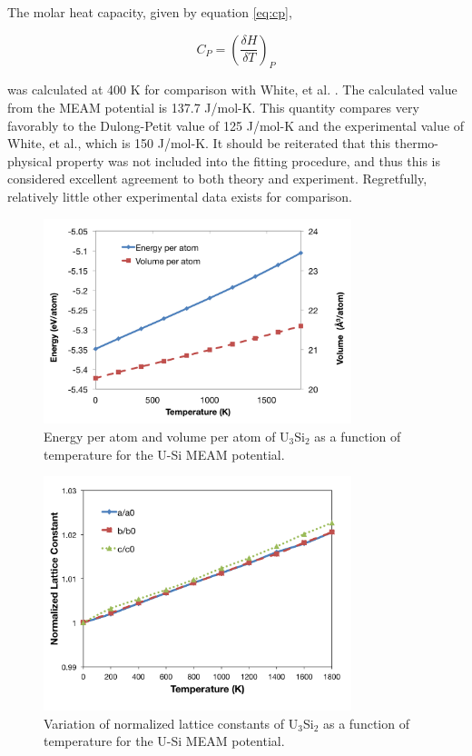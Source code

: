 \documentclass[review]{elsarticle}
\begin{document}
The molar heat capacity, given by equation \ref{eq:cp}, 

\begin{equation}
\label{eq:cp}
C_{P} = \left(\frac{\delta H}{\delta T}\right)_{P}
\end{equation}

was calculated at 400 K for comparison with White, et al. \cite{white2015}.  The calculated value from the MEAM potential is 137.7 J/mol-K.  This quantity compares very favorably to the Dulong-Petit value of 125 J/mol-K and the experimental value of White, et al., which is 150 J/mol-K.  It should be reiterated that this thermo-physical property was not included into the fitting procedure, and thus this is considered excellent agreement to both theory and experiment.  Regretfully, relatively little other experimental data exists for comparison.  

 \begin{figure}[hbt]
	\centering
	\includegraphics[width=0.8\textwidth]{tempKK1.png}
    \caption{Energy per atom and volume per atom of U$_{3}$Si$_{2}$ as a function of temperature for the U-Si MEAM potential.}\label{fig:temp}
\end{figure}

\begin{figure}[hbt]
	\centering
	\includegraphics[width=0.8\textwidth]{latticeKK1.png}
    \caption{Variation of normalized lattice constants of U$_{3}$Si$_{2}$ as a function of temperature for the U-Si MEAM potential.}\label{fig:latticetemp}
\end{figure}
\end{document}
